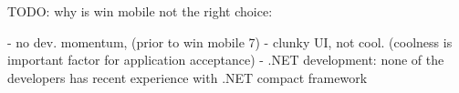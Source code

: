 TODO: why is win mobile not the right choice:

- no dev. momentum, (prior to win mobile 7)
- clunky UI, not cool. (coolness is important factor for application acceptance)
- .NET development: none of the developers has recent experience with .NET compact framework